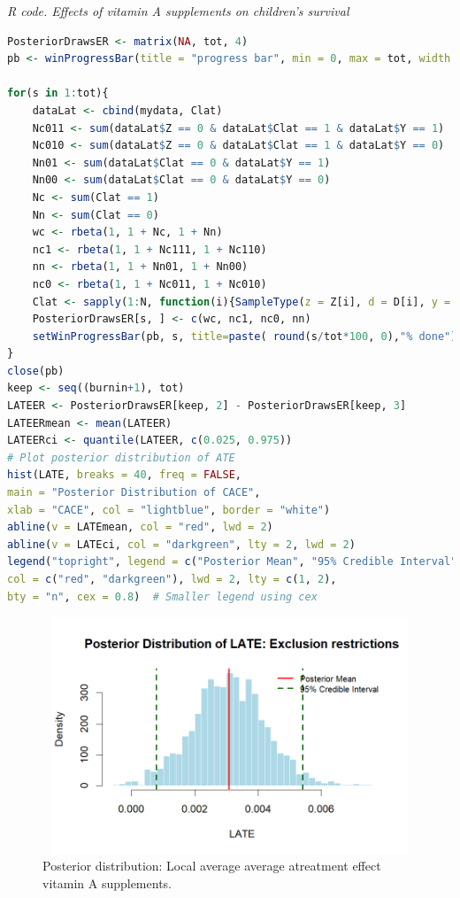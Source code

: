 \begin{tcolorbox}[enhanced,width=4.67in,center upper,
	fontupper=\large\bfseries,drop shadow southwest,sharp corners]
	\textit{R code. Effects of vitamin A supplements on children's survival}
	\begin{VF}
		\begin{lstlisting}[language=R]
PosteriorDrawsER <- matrix(NA, tot, 4)
pb <- winProgressBar(title = "progress bar", min = 0, max = tot, width = 300)

for(s in 1:tot){
	dataLat <- cbind(mydata, Clat)
	Nc011 <- sum(dataLat$Z == 0 & dataLat$Clat == 1 & dataLat$Y == 1)
	Nc010 <- sum(dataLat$Z == 0 & dataLat$Clat == 1 & dataLat$Y == 0)
	Nn01 <- sum(dataLat$Clat == 0 & dataLat$Y == 1)
	Nn00 <- sum(dataLat$Clat == 0 & dataLat$Y == 0)
	Nc <- sum(Clat == 1)
	Nn <- sum(Clat == 0)
	wc <- rbeta(1, 1 + Nc, 1 + Nn)
	nc1 <- rbeta(1, 1 + Nc111, 1 + Nc110)
	nn <- rbeta(1, 1 + Nn01, 1 + Nn00)
	nc0 <- rbeta(1, 1 + Nc011, 1 + Nc010)
	Clat <- sapply(1:N, function(i){SampleType(z = Z[i], d = D[i], y = Y[i], wc = wc, nc0 = nc0, nn0 = nn)})
	PosteriorDrawsER[s, ] <- c(wc, nc1, nc0, nn)
	setWinProgressBar(pb, s, title=paste( round(s/tot*100, 0),"% done"))
}
close(pb)
keep <- seq((burnin+1), tot)
LATEER <- PosteriorDrawsER[keep, 2] - PosteriorDrawsER[keep, 3]
LATEERmean <- mean(LATEER)
LATEERci <- quantile(LATEER, c(0.025, 0.975))
# Plot posterior distribution of ATE
hist(LATE, breaks = 40, freq = FALSE,
main = "Posterior Distribution of CACE",
xlab = "CACE", col = "lightblue", border = "white")
abline(v = LATEmean, col = "red", lwd = 2)
abline(v = LATEci, col = "darkgreen", lty = 2, lwd = 2)
legend("topright", legend = c("Posterior Mean", "95% Credible Interval"),
col = c("red", "darkgreen"), lwd = 2, lty = c(1, 2),
bty = "n", cex = 0.8)  # Smaller legend using cex
\end{lstlisting}
	\end{VF}
\end{tcolorbox} 

\begin{figure}[h!]
	\includegraphics[width=340pt, height=200pt]{Chapters/chapter12/figures/LATE.png}
	\caption[List of figure caption goes here]{Posterior distribution: Local average average atreatment effect vitamin A supplements.}\label{fig12_LATE}
\end{figure}


